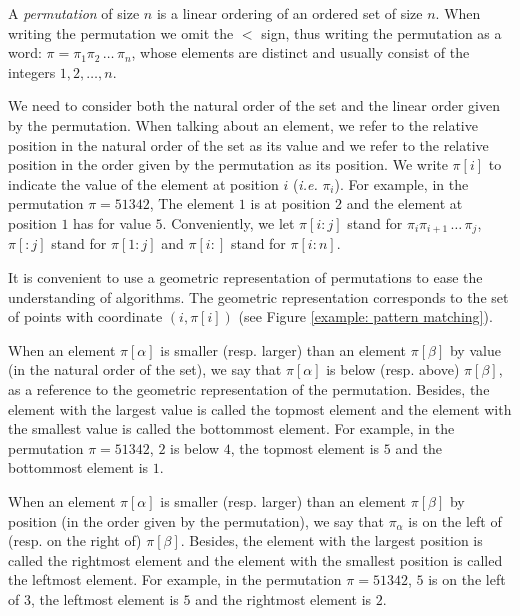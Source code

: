 \documentclass[a4paper]{llncs}
\DeclareMathOperator{\RED}{red}
\begin{document}
A \textit{permutation} of size $n$ is a linear ordering of an ordered set of size $n$.
When writing the permutation we omit the $<$ sign, thus
writing the permutation as a word:
$\pi = \pi_1\pi_2\,\ldots\,\pi_n$, whose elements are distinct
and usually consist of the integers $1,2,\ldots,n$.

We need to consider both the natural order of the set
and the linear order given by the permutation.
When talking about an element,
we refer to the relative position in
the natural order of the set
as its value
and
we refer to the relative position
in the order given by the permutation
as its position.
We write
$\pi[i]$ to indicate the value of the element
at position $i$ (\emph{i.e.} $\pi_i$).
For example, in the permutation $\pi = 51342$,
The element $1$ is at position $2$
and the element at position $1$ has for value $5$.
Conveniently, we let
$\pi[i:j]$ stand for
$\pi_i\pi_{i+1}\,\ldots\,\pi_j$,
$\pi[:j]$ stand for $\pi[1:j]$ and
$\pi[i:]$ stand for $\pi[i:n]$.

It is convenient to use a geometric representation of permutations
to ease the understanding of algorithms.
The geometric representation corresponds to the set of points with coordinate $(i,\pi[i])$
(see Figure \ref{example: pattern matching}).


When an element $\pi[\alpha]$ is smaller (resp. larger)
than an element $\pi[\beta]$  by value (in the natural order of the set),
we say that $\pi[\alpha]$ is below (resp. above) $\pi[\beta]$,
as a reference to the geometric representation of the permutation.
Besides, the element with the largest value is called
the topmost element and the element with the smallest value
is called the bottommost element.
For example, in the permutation $\pi = 51342$,
$2$ is below $4$, the topmost element is $5$
and the bottommost element is $1$.

When an element $\pi[\alpha]$ is smaller (resp. larger)
than an element $\pi[\beta]$  by position (in the order given by the permutation),
we say that $\pi_\alpha$ is on the left of (resp. on the right of) $\pi[\beta]$.
Besides, the element with the largest position is called the rightmost element
and the element with the smallest position is called the leftmost element.
For example, in the permutation $\pi = 51342$,
$5$ is on the left of $3$, the leftmost element is $5$
and the rightmost element is $2$.


\end{document}
